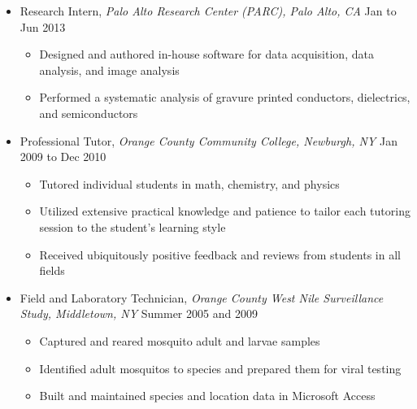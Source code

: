 \documentclass[9pt,letterpaper]{article}
\begin{document}
{{\begin{itemize}
    {\footnotesize\begin{itemize} 
        \item Designed lab exercises to teach basic thermodynamics, electronics, and programming
        \item Performed teaching assistant duties including hands-on teaching of basic electronics and programming  
    \end{itemize}}
  \item \noindent Research Intern, \emph{Palo Alto Research Center (PARC), Palo Alto, CA} \hfill {\scriptsize Jan to Jun 2013}
    {\footnotesize\begin{itemize} 
        \item Designed and authored in-house software for data acquisition, data analysis, and image analysis
        \item Performed a systematic analysis of gravure printed conductors, dielectrics, and semiconductors
    \end{itemize}}
  \item \noindent Professional Tutor, \emph{Orange County Community College, Newburgh, NY} \hfill {\scriptsize Jan 2009 to Dec 2010}
    {\footnotesize\begin{itemize} 
        \item Tutored individual students in math, chemistry, and physics
        \item Utilized extensive practical knowledge and patience to tailor each tutoring session to the student's learning style
        \item Received ubiquitously positive feedback and reviews from students in all fields
    \end{itemize}}
  \item \noindent Field and Laboratory Technician, \emph{Orange County West Nile Surveillance Study, Middletown, NY} \hfill {\scriptsize Summer 2005 and 2009}
    {\footnotesize\begin{itemize} 
        \item Captured and reared mosquito adult and larvae samples
        \item Identified adult mosquitos to species and prepared them for viral testing
        \item Built and maintained species and location data in Microsoft Access 
    \end{itemize}}
\end{itemize}}
}
\end{document}
